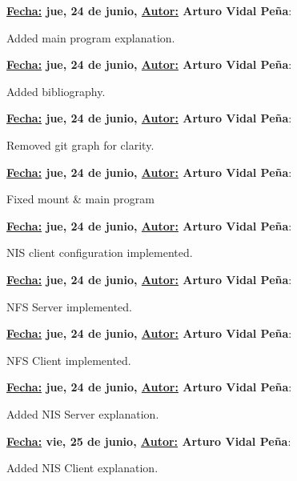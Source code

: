 \item \textbf{\underline{Fecha:} jue, 24 de junio, \underline{Autor:} Arturo Vidal Peña}:\\\item[] Added main program explanation.\\
\item \textbf{\underline{Fecha:} jue, 24 de junio, \underline{Autor:} Arturo Vidal Peña}:\\\item[] Added bibliography.\\
\item \textbf{\underline{Fecha:} jue, 24 de junio, \underline{Autor:} Arturo Vidal Peña}:\\\item[] Removed git graph for clarity.\\
\item \textbf{\underline{Fecha:} jue, 24 de junio, \underline{Autor:} Arturo Vidal Peña}:\\\item[] Fixed mount \& main program\\
\item \textbf{\underline{Fecha:} jue, 24 de junio, \underline{Autor:} Arturo Vidal Peña}:\\\item[] NIS client configuration implemented.\\
\item \textbf{\underline{Fecha:} jue, 24 de junio, \underline{Autor:} Arturo Vidal Peña}:\\\item[] NFS Server implemented.\\
\item \textbf{\underline{Fecha:} jue, 24 de junio, \underline{Autor:} Arturo Vidal Peña}:\\\item[] NFS Client implemented.\\
\item \textbf{\underline{Fecha:} jue, 24 de junio, \underline{Autor:} Arturo Vidal Peña}:\\\item[] Added NIS Server explanation.\\
\item \textbf{\underline{Fecha:} vie, 25 de junio, \underline{Autor:} Arturo Vidal Peña}:\\\item[] Added NIS Client explanation.\\
